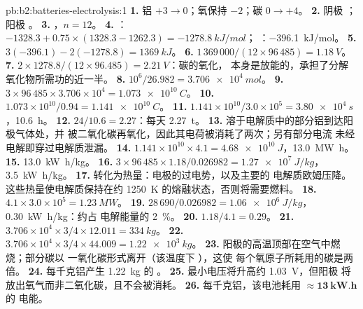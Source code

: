 \begin{solution}{pb:b2:batteries-electrolysis:1}
\textbf{1.} 铝 $+3 \to 0$；氧保持 $-2$；碳 $0 \to +4$。
\textbf{2.} 阴极 ；阳极 。
\textbf{3.} ，$n = 12$。
\textbf{4.} ：$-1328.3 + 0.75 \times (1328.3 - 1262.3) = \qty{-1278.8}{kJ/mol}$；
：\qty{-396.1}{kJ/mol}。
\textbf{5.} $3(-396.1) - 2(-1278.8) = \qty{+1369}{kJ}$。
\textbf{6.} $1\,369\,000/(12 \times 96\,485) = \qty{1.18}{V}$。
\textbf{7.} $2 \times 1278.8/(12 \times 96.485) = \qty{2.21}{V}$：碳的氧化，
本身是放能的，承担了分解氧化物所需功的近一半。
\textbf{8.} $10^6/26.982 = \qty{3.706e4}{mol}$。
\textbf{9.} $3 \times 96\,485 \times 3.706 \times 10^4 = \qty{1.073e10}{C}$。
\textbf{10.} $1.073 \times 10^{10}/0.94 = \qty{1.141e10}{C}$。
\textbf{11.} $1.141 \times 10^{10}/3.0 \times 10^5 = \qty{3.80e4}{s}$，\qty{10.6}{h}。
\textbf{12.} $24/10.6 = 2.27$：每天 \qty{2.27}{t}。
\textbf{13.} 溶于电解质中的部分铝到达阳极气体处，并
被二氧化碳再氧化，因此其电荷被消耗了两次；另有部分电流
未经电解即穿过电解质泄漏。
\textbf{14.} $1.141 \times 10^{10} \times 4.1 = \qty{4.68e10}{J}$，\qty{13.0}{MW.h}。
\textbf{15.} \qty{13.0}{kW.h/kg}。
\textbf{16.} $3 \times 96\,485 \times 1.18/0.026982 = \qty{1.27e7}{J/kg}$，\qty{3.5}{kW.h/kg}。
\textbf{17.} 转化为热量：电极的过电势，以及主要的
电解质欧姆压降。这些热量使电解质保持在约
\qty{1250}{K} 的熔融状态，否则将需要燃料。
\textbf{18.} $4.1 \times 3.0 \times 10^5 = \qty{1.23}{MW}$。
\textbf{19.} $28\,690/0.026982 = \qty{1.06e6}{J/kg}$，\qty{0.30}{kW.h/kg}：约占
电解能量的 2~\%。
\textbf{20.} $1.18/4.1 = 0.29$。
\textbf{21.} $3.706 \times 10^4 \times 3/4 \times 12.011 = \qty{334}{kg}$。
\textbf{22.} $3.706 \times 10^4 \times 3/4 \times 44.009 = \qty{1.22e3}{kg}$。
\textbf{23.} 阳极的高温顶部在空气中燃烧；部分碳以
一氧化碳形式离开（该温度下 ），这使
每个氧原子所耗用的碳是两倍。
\textbf{24.} 每千克铝产生 \qty{1.22}{kg} 的 。
\textbf{25.} 最小电压将升高约 \qty{1.03}{V}，但阳极
将放出氧气而非二氧化碳，且不会被消耗。
\textbf{26.} 每千克铝，该电池耗用 $\boldsymbol{\approx \qty{13}{kW.h}}$ 的
电能。
\end{solution}
